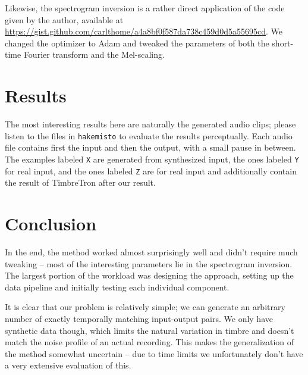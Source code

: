 \documentclass[12pt]{article}
\begin{document}
Likewise, the spectrogram inversion is a rather direct application of the code given by the author, available at\\ \url{https://gist.github.com/carlthome/a4a8bf0f587da738c459d0d5a55695cd}. We changed the optimizer to Adam and tweaked the parameters of both the short-time Fourier transform and the Mel-scaling.

\section{Results}
The most interesting results here are naturally the generated audio clips; please listen to the files in \texttt{hakemisto} to evaluate the results perceptually. Each audio file contains first the input and then the output, with a small pause in between. The examples labeled \texttt{X} are generated from synthesized input, the ones labeled \texttt{Y} for real input, and the ones labeled \texttt{Z} are for real input and additionally contain the result of TimbreTron after our result.



\section{Conclusion}
In the end, the method worked almost surprisingly well and didn't require much tweaking -- most of the interesting parameters lie in the spectrogram inversion. The largest portion of the workload was designing the approach, setting up the data pipeline and initially testing each individual component.

It is clear that our problem is relatively simple; we can generate an arbitrary number of exactly temporally matching input-output pairs. We only have synthetic data though, which limits the natural variation in timbre and doesn't match the noise profile of an actual recording. This makes the generalization of the method somewhat uncertain -- due to time limits we unfortunately don't have a very extensive evaluation of this.



\end{document}
